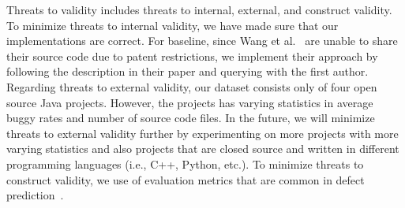 Threats to validity includes threats to internal, external, and construct validity. To minimize threats to internal validity, we have made sure that our implementations are correct. For baseline, since Wang et al.~\cite{wang2016automatically} are unable to share their source code due to patent restrictions, we implement their approach by following the description in their paper and querying with the first author. Regarding threats to external validity, our dataset consists only of four open source Java projects. However, the projects has varying statistics in average buggy rates and number of source code files. In the future, we will minimize threats to external validity further by experimenting on more projects with more varying statistics and also projects that are closed source and written in different programming languages (i.e., C++, Python, etc.). To minimize threats to construct validity, we use of evaluation metrics that are common in defect prediction~\cite{menzies2007data, menzies2010defect, nam2013transfer}.


